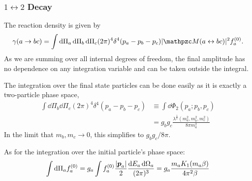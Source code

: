 \documentclass{scrartcl}
\begin{document}
\subsubsection{\(1 \leftrightarrow 2\) Decay}

The reaction density is given by
\begin{equation}
  \gamma(a \rightarrow bc) =
  \int \dd \Pi_a \dd \Pi_b \dd \Pi_c (2\pi)^4
  \delta^4(p_a - p_b - p_c)
  \abs{\pzcM(a \leftrightarrow bc)}^2 f_a^{(0)}.
\end{equation}
As we are summing over all internal degrees of freedom, the final amplitude has
no dependence on any integration variable and can be taken outside the integral.

The integration over the final state particles can be done easily as it is
exactly a two-particle phase space,
\begin{equation}
  \begin{aligned}
    \int \dd \Pi_b \dd \Pi_c (2\pi)^4 \delta^4(p_a - p_b - p_c)
     & \equiv \int \dd \Phi_2(p_a; p_b, p_c)                                    \\
     & = g_b g_c \frac{\lambda^{\frac{1}{2}}(m_a^2, m_b^2, m_c^2)}{8 \pi m_a^2}
  \end{aligned}
\end{equation}
In the limit that \(m_b, m_c \to 0\), this simplifies to \(g_b g_c / 8 \pi\).


As for the integration over the initial particle's phase space:
\begin{equation}
  \int \mathop{}\!\mathrm{d} \Pi_a f_a^{(0)}
  = g_a \int f_a^{(0)} \frac{\lvert\boldsymbol{p}_a\rvert}{2} \frac{\mathop{}\!\mathrm{d} E_a \mathop{}\!\mathrm{d} \Omega_a}{(2\pi)^3}
  = g_a \frac{m_a K_1(m_a \beta)}{4 \pi^2 \beta}
\end{equation}
\end{document}
